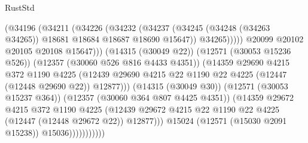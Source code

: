 \begin{lexlean}{RustStd}
\begin{coremodule}
                                      (@34196
                                        (@34211
                                          (@34226
                                            (@34232
                                              (@34237
                                                (@34245
                                                  (@34248 (@34263 @34265))
                                                  @18681
                                                  @18684
                                                  @18687
                                                  @18690
                                                  @15647))
                                              @34265)))))
                                    @20099
                                    @20102
                                    @20105
                                    @20108
                                    @15647)))
                              (@14315 (@30049 @22))
                              (@12571 (@30053 @15236 @526))
                              (@12357 (@30060 @526 @816 @4433 @4351))
                              (@14359
                                @29690
                                @4215
                                @372
                                @1190
                                @4225
                                (@12439
                                  @29690
                                  @4215
                                  @22
                                  @1190
                                  @22
                                  @4225
                                  (@12447 (@12448 @29690 @22))
                                  @12877)))
                            (@14315 (@30049 @30))
                            (@12571 (@30053 @15237 @364))
                            (@12357 (@30060 @364 @807 @4425 @4351))
                            (@14359
                              @29672
                              @4215
                              @372
                              @1190
                              @4225
                              (@12439
                                @29672
                                @4215
                                @22
                                @1190
                                @22
                                @4225
                                (@12447 (@12448 @29672 @22))
                                @12877)))
                          @15024
                          (@12571 (@15030 @2091 @15238))
                          @15036)))))))))))

\end{coremodule}
\end{lexlean}
